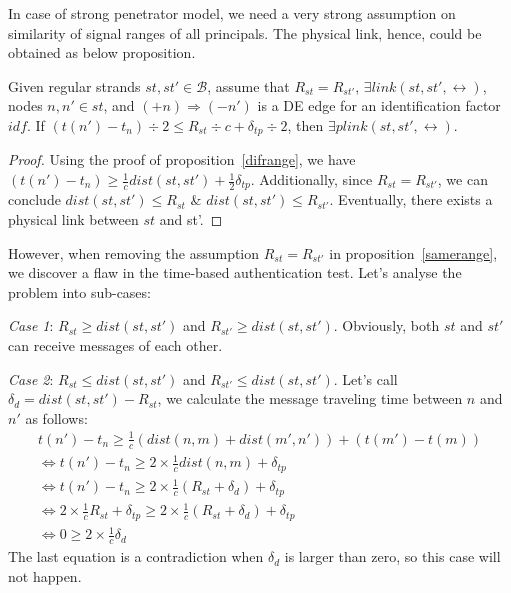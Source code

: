 In case of strong penetrator model, we need a very strong assumption on similarity of signal ranges of all principals. The physical link, hence, could be obtained as below proposition. 

\begin{Proposition}\label{samerange}
Given regular strands $st, st' \in \mathcal{B}$, assume that $R_{st} = R_{st'}$, $\exists link(st,st', \leftrightarrow)$, nodes $n,n' \in st$, and $(+n) \Rightarrow (-n')$ is a DE edge for an identification factor $idf$. If $(t(n') - t_n)\div 2 \le R_{st} \div c + \delta_{tp} \div 2$, then $\exists plink(st,st',\leftrightarrow)$. 
\end{Proposition}
\begin{proof}

Using the proof of proposition~\ref{difrange}, we have $(t(n') - t_n) \ge \frac 1 {c} dist(st,st') + \frac 1 {2} \delta_{tp}$. Additionally, since $R_{st} = R_{st'}$, we can conclude $dist(st,st') \le R_{st}$ \&  $dist(st,st') \le R_{st'}$. Eventually, there exists a physical link between $st$ and st'. 


\end{proof}

However, when removing the assumption $R_{st} = R_{st'}$ in proposition~\ref{samerange}, we discover a flaw in the time-based authentication test. Let's analyse the problem into sub-cases:

\emph{Case 1}: $R_{st} \ge dist(st,st')$ and $R_{st'} \ge dist(st,st')$. Obviously, both $st$ and $st'$ can receive messages of each other. 

\emph{Case 2}: $R_{st} \le dist(st,st')$ and $R_{st'} \le dist(st,st')$. Let's call $\delta_d = dist(st,st') - R_{st}$, we calculate the message traveling time between $n$ and $n'$ as follows: 
\begin{equation*}
\begin{split}
	 t(n') - t_n \ge \frac 1 {c}(dist(n,m) + dist(m', n')) + (t(m') - t(m)) \\ \Leftrightarrow
	t(n') - t_n \ge 2 \times \frac 1 {c} dist(n,m) + \delta_{tp}  \\
\Leftrightarrow	t(n') - t_n \ge 2 \times \frac 1 {c}(R_{st} + \delta_d) + \delta_{tp} \\
\Leftrightarrow	2 \times \frac 1 {c} R_{st} + \delta_{tp} \ge 2 \times \frac 1 {c} (R_{st} + \delta_d) + \delta_{tp} \\
\Leftrightarrow	0 \ge 2 \times \frac 1 {c} \delta_d 
\end{split}
\end{equation*}
The last equation is a contradiction when $\delta_d$ is larger than zero, so this case will not happen. 

